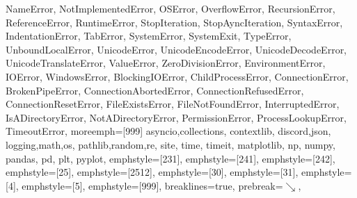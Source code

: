 {{  NameError, NotImplementedError, OSError, OverflowError, RecursionError,
  ReferenceError, RuntimeError, StopIteration, StopAyncIteration, SyntaxError,
  IndentationError, TabError, SystemError, SystemExit, TypeError,
  UnboundLocalError, UnicodeError, UnicodeEncodeError, UnicodeDecodeError,
  UnicodeTranslateError, ValueError, ZeroDivisionError, EnvironmentError,
  IOError, WindowsError,
  BlockingIOError, ChildProcessError, ConnectionError, BrokenPipeError,
  ConnectionAbortedError, ConnectionRefusedError, ConnectionResetError,
  FileExistsError, FileNotFoundError, InterruptedError, IsADirectoryError,
  NotADirectoryError, PermissionError, ProcessLookupError, TimeoutError},
  moreemph=[999]{%
  asyncio,collections, contextlib,
  discord,json,
  logging,math,os,
  pathlib,random,re, site,
  time, timeit,
  matplotlib, np, numpy, pandas, pd, plt, pyplot},
  emphstyle=[231]{\color{magenta}}, %
  emphstyle=[241]{\color{magenta}}, %
  emphstyle=[242]{\color{magenta}}, %
  emphstyle=[25]{\color{brightcyan}}, %
  emphstyle=[2512]{\color{brightblue}}, %
  emphstyle=[30]{\color{brightcyan}},
  emphstyle=[31]{\color{brightblue}}, %
  emphstyle=[4]{\color{brightmagenta}},
  emphstyle=[5]{\bfseries\color{red}},
  emphstyle=[999]{\color{brightyellow}}, %
  breaklines=true,
  prebreak=\mbox{{\color{brightblack}\scriptsize$\searrow$}},
}

\makeatletter
\def\cconv#1{%
	\extractcolorspecs{#1}{\model}{\mycolor}
	\definecolor{w}{HTML}{FFFFFF} \definecolor{b}{HTML}{000000}
	\def\c@html{\convertcolorspec{\model}{\mycolor}{HTML}\tmp\tmp}
	\def\c@rgb{\convertcolorspec{\model}{\mycolor}{RGB}\tmp\tmp}
	\def\c@cmyk{\convertcolorspec{\model}{\mycolor}{cmyk}\tmp\tmp}
	\def\chonkyclr{\Large\sf\c@html}
	\vbox{\offinterlineskip\footnotesize\tt\hsize=18em
	\halign{\color{fg}
		\hfil##: &
		\vtop{\hsize=18em\parindent0em\hangindent0em \strut\color{fg}##\strut}&
		\hfil##&\hfil##&\hfil##&\hfil##\cr
		\omit\textcolor{cyan}{\MakeUppercase{\sf Colour info for #1}}\hidewidth\cr\noalign{\medskip}
		\sf HTML&\#\c@html\cr
		\sf RGB&[\c@rgb]\cr
		\sf CMYK&[\c@cmyk]\cr
	}
	\halign{
	\hfil\strut##\strut&\strut##\strut\hfil\cr
	\fcolorbox{w}{w}{\color{#1}\chonkyclr}&
	\fcolorbox{w}{b}{\color{#1}\chonkyclr}\cr
	\fcolorbox{w}{#1}{\color{w}\chonkyclr}&
	\fcolorbox{w}{#1}{\color{b}\chonkyclr}\cr\noalign{\medskip}
		}
	}
}
\makeatother

